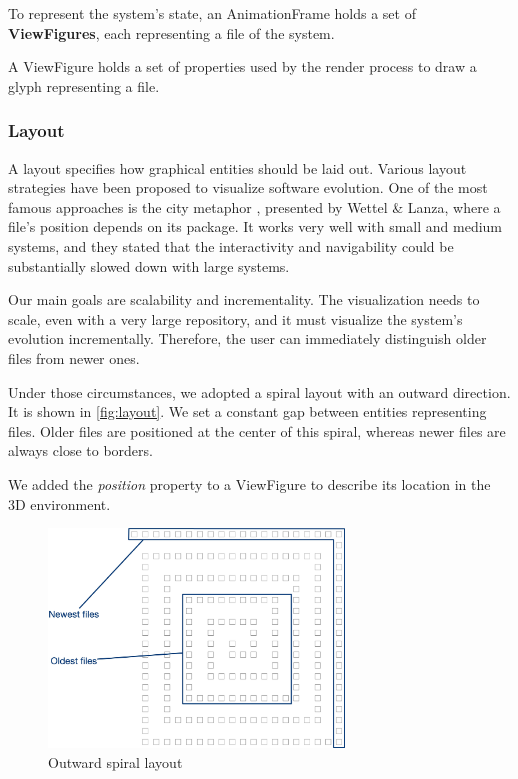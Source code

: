 To represent the system's state, an AnimationFrame holds a set of \textbf{ViewFigures}, each representing a file of the system.

A ViewFigure holds a set of properties used by the render process to draw a glyph representing a file. 

\subsubsection*{Layout}
A layout specifies how graphical entities should be laid out. 
Various layout strategies have been proposed to visualize software evolution.
One of the most famous approaches is the city metaphor \cite{Wettel2007}, presented by Wettel \& Lanza, where a file's position depends on its package. It works very well with small and medium systems, and they stated that the interactivity and navigability could be substantially slowed down with large systems.

Our main goals are scalability and incrementality. The visualization needs to scale, even with a very large repository, and it must visualize the system's evolution incrementally. Therefore, the user can immediately distinguish older files from newer ones.

Under those circumstances, we adopted a spiral layout with an outward direction. It is shown in \autoref{fig:layout}. We set a constant gap between entities representing files. 
Older files are positioned at the center of this spiral, whereas newer files are always close to borders. 

We added the \textit{position} property to a ViewFigure to describe its location in the 3D environment. 

\begin{figure}
    \center
    \includegraphics[width=0.7\textwidth]{SpiralLayout.jpg}
    \caption{Outward spiral layout}
    \label{fig:layout}
\end{figure}

